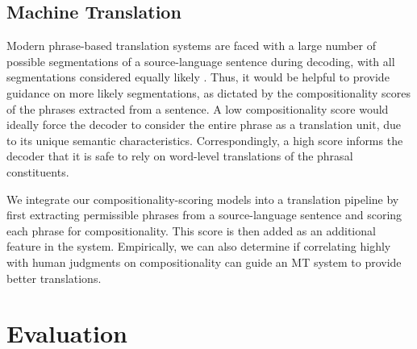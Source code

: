\documentclass[11pt,letterpaper]{article}
\begin{document}
\subsection{Machine Translation}
Modern phrase-based translation systems are faced with a large number of possible segmentations of a source-language sentence during decoding, with all segmentations considered equally likely \cite{Koehn2003}.  
Thus, it would be helpful to provide guidance on more likely segmentations, as dictated by the compositionality scores of the phrases extracted from a sentence. 
A low compositionality score would ideally force the decoder to consider the entire phrase as a translation unit, due to its unique semantic characteristics.
Correspondingly, a high score informs the decoder that it is safe to rely on word-level translations of the phrasal constituents.

We integrate our compositionality-scoring models into a translation pipeline by first extracting permissible phrases from a source-language sentence and scoring each phrase for compositionality. 
This score is then added as an additional feature in the system. 
Empirically, we can also determine if correlating highly with human judgments on compositionality can guide an MT system to provide better translations. 

\section{Evaluation}
\label{sec:experiments}
\end{document}
